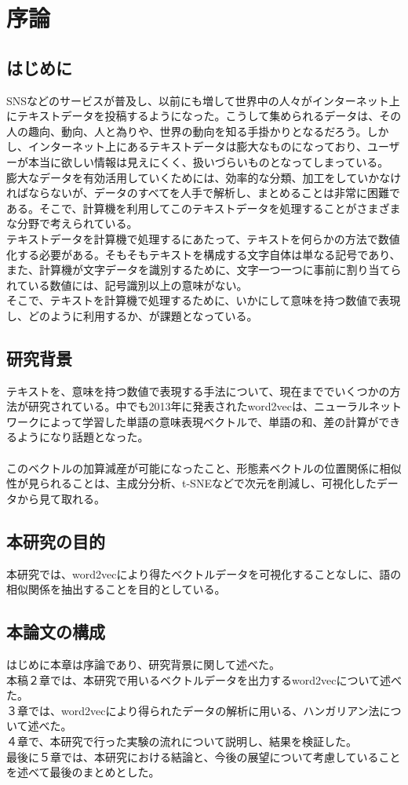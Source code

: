 \chapter{序論}

\section{はじめに}
SNSなどのサービスが普及し、以前にも増して世界中の人々がインターネット上にテキストデータを投稿するようになった。こうして集められるデータは、その人の趣向、動向、人と為りや、世界の動向を知る手掛かりとなるだろう。しかし、インターネット上にあるテキストデータは膨大なものになっており、ユーザーが本当に欲しい情報は見えにくく、扱いづらいものとなってしまっている。\\
膨大なデータを有効活用していくためには、効率的な分類、加工をしていかなければならないが、データのすべてを人手で解析し、まとめることは非常に困難である。そこで、計算機を利用してこのテキストデータを処理することがさまざまな分野で考えられている。
\\
テキストデータを計算機で処理するにあたって、テキストを何らかの方法で数値化する必要がある。そもそもテキストを構成する文字自体は単なる記号であり、また、計算機が文字データを識別するために、文字一つ一つに事前に割り当てられている数値には、記号識別以上の意味がない。\\
そこで、テキストを計算機で処理するために、いかにして意味を持つ数値で表現し、どのように利用するか、が課題となっている。
\\
\section{研究背景}
テキストを、意味を持つ数値で表現する手法について、現在まででいくつかの方法が研究されている。中でも2013年に発表されたword2vecは、ニューラルネットワークによって学習した単語の意味表現ベクトルで、単語の和、差の計算ができるようになり話題となった。\\
\\
このベクトルの加算減産が可能になったこと、形態素ベクトルの位置関係に相似性が見られることは、主成分分析、t-SNEなどで次元を削減し、可視化したデータから見て取れる。
\\
\section{本研究の目的}
本研究では、word2vecにより得たベクトルデータを可視化することなしに、語の相似関係を抽出することを目的としている。
\\
\section{本論文の構成}
はじめに本章は序論であり、研究背景に関して述べた。\\
本稿２章では、本研究で用いるベクトルデータを出力するword2vecについて述べた。\\
３章では、word2vecにより得られたデータの解析に用いる、ハンガリアン法について述べた。\\
４章で、本研究で行った実験の流れについて説明し、結果を検証した。\\
最後に５章では、本研究における結論と、今後の展望について考慮していることを述べて最後のまとめとした。\\
